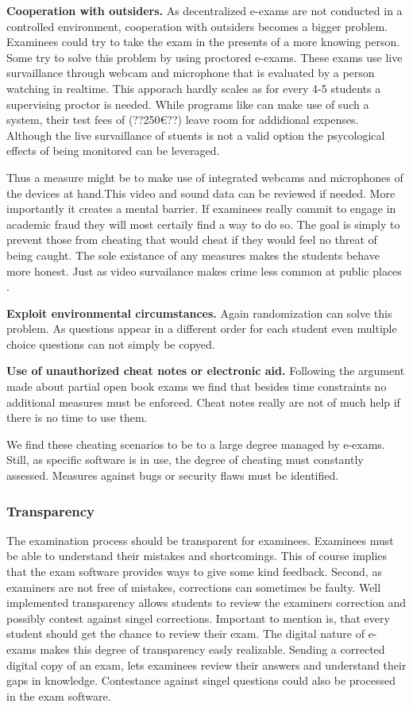 \textbf{Cooperation with outsiders.} As decentralized e-exams are not
conducted in a controlled environment, cooperation with outsiders
becomes a bigger problem. Examinees could try to take the exam in the
presents of a more knowing person. Some try to solve this problem by
using proctored e-exams. These exams use live survaillance through
webcam and microphone that is evaluated by a person watching in
realtime. This apporach hardly scales as for every 4-5 students a
supervising proctor is needed. While programs like can make use of such
a system, their test fees of (??250€??) leave room for addidional
expenses. Although the live survaillance of stuents is not a valid
option the psycological effects of being monitored can be leveraged.

Thus a measure might be to make use of integrated webcams and
microphones of the devices at hand.This video and sound data can be
reviewed if needed. More importantly it creates a mental barrier. If
examinees really commit to engage in academic fraud they will most
certaily find a way to do so. The goal is simply to prevent those from
cheating that would cheat if they would feel no threat of being caught.
The sole existance of any measures makes the students behave more
honest. Just as video survailance makes crime less common at public
places .

\textbf{Exploit environmental circumstances.} Again randomization can
solve this problem. As questions appear in a different order for each
student even multiple choice questions can not simply be copyed.

\textbf{Use of unauthorized cheat notes or electronic aid.} Following
the argument made about partial open book exams we find that besides
time constraints no additional measures must be enforced. Cheat notes
really are not of much help if there is no time to use them.

We find these cheating scenarios to be to a large degree managed by
e-exams. Still, as specific software is in use, the degree of cheating
must constantly assessed. Measures against bugs or security flaws must
be identified.

\hypertarget{transparency}{%
\subsubsection{Transparency}\label{transparency}}

The examination process should be transparent for examinees. Examinees
must be able to understand their mistakes and shortcomings. This of
course implies that the exam software provides ways to give some kind
feedback. Second, as examiners are not free of mistakes, corrections can
sometimes be faulty. Well implemented transparency allows students to
review the examiners correction and possibly contest against singel
corrections. Important to mention is, that every student should get the
chance to review their exam. The digital nature of e-exams makes this
degree of transparency easly realizable. Sending a corrected digital
copy of an exam, lets examinees review their answers and understand
their gaps in knowledge. Contestance against singel questions could also
be processed in the exam software.

